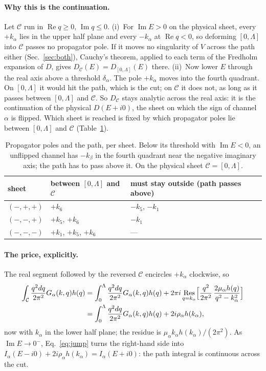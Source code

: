 \documentclass[11pt]{article}
\begin{document}
\paragraph{Why this is the continuation.}
Let $\mathcal C$ run in $\operatorname{Re}q\ge0$, $\operatorname{Im}q\le0$. (i)~For $\operatorname{Im}E>0$ on the physical sheet, every $+k_\alpha$ lies in the upper half plane and every $-k_\alpha$ at $\operatorname{Re}q<0$, so deforming $[0,\Lambda]$ into $\mathcal C$ passes no propagator pole. If it moves no singularity of $V$ across the path either (Sec.~\ref{sec:both}), Cauchy's theorem, applied to each term of the Fredholm expansion of $D$, gives $D_{\mathcal C}(E)=D_{[0,\Lambda]}(E)$ there. (ii)~Now lower $E$ through the real axis above a threshold $\delta_\alpha$. The pole $+k_\alpha$ moves into the fourth quadrant. On $[0,\Lambda]$ it would hit the path, which is the cut; on $\mathcal C$ it does not, as long as it passes between $[0,\Lambda]$ and $\mathcal C$. So $D_{\mathcal C}$ stays analytic across the real axis: it is the continuation of the physical $D(E+i0)$, the sheet on which the sign of channel $\alpha$ is flipped. Which sheet is reached is fixed by which propagator poles lie between $[0,\Lambda]$ and $\mathcal C$ (Table~\ref{tab:paths}).
\begin{table}[h]
\centering
\begin{tabular}{lll}
\toprule
sheet & between $[0,\Lambda]$ and $\mathcal C$ & must stay outside (path passes above)\\
\midrule
$(-,+,+)$ & $+k_6$ & $-k_5$, $-k_1$\\
$(-,-,+)$ & $+k_5$, $+k_6$ & $-k_1$\\
$(-,-,-)$ & $+k_1$, $+k_5$, $+k_6$ & ---\\
\bottomrule
\end{tabular}
\caption{Propagator poles and the path, per sheet. Below its threshold with $\operatorname{Im}E<0$, an unflipped channel has $-k_\beta$ in the fourth quadrant near the negative imaginary axis; the path has to pass above it. On the physical sheet $\mathcal C=[0,\Lambda]$.}
\label{tab:paths}
\end{table}

\paragraph{The price, explicitly.}
The real segment followed by the reversed $\mathcal C$ encircles $+k_\alpha$ clockwise, so
\begin{align}
\int_{\mathcal C}\frac{q^2dq}{2\pi^2}G_\alpha(k,q)h(q)
&=\int_0^\Lambda\frac{q^2dq}{2\pi^2}G_\alpha(k,q)h(q)+2\pi i\operatorname*{Res}_{q=k_\alpha}\Bigl[\frac{q^2}{2\pi^2}\,\frac{2\mu_\alpha h(q)}{q^2-k_\alpha^2}\Bigr]\nonumber\\
&=\int_0^\Lambda\frac{q^2dq}{2\pi^2}G_\alpha(k,q)h(q)+2i\rho_\alpha h(k_\alpha),\label{eq:residue}
\end{align}
now with $k_\alpha$ in the lower half plane; the residue is $\mu_\alpha k_\alpha h(k_\alpha)/(2\pi^2)$. As $\operatorname{Im}E\to0^-$, Eq.~\eqref{eq:jump} turns the right-hand side into $I_\alpha(E-i0)+2i\rho_\alpha h(k_\alpha)=I_\alpha(E+i0)$: the path integral is continuous across the cut.
\end{document}
